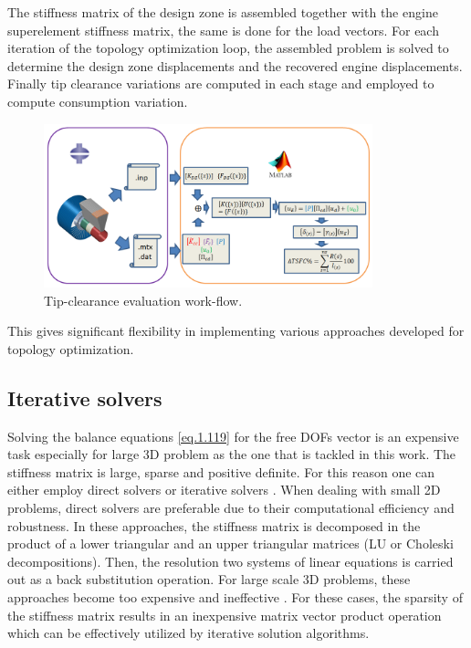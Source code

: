 The stiffness matrix of the design zone is assembled together with the engine superelement stiffness matrix, the same is done for the load vectors. For each iteration of the topology optimization loop, the assembled problem is solved to determine the design zone displacements and the recovered engine displacements.  Finally tip clearance variations are computed in each stage and employed to compute consumption variation.
\begin{figure}[hbt!]
\centering
\includegraphics[width=0.85\textwidth]{images/Ch1/tip_cl_wkf.png}
\caption{Tip-clearance evaluation work-flow. 
\label{f.6b}}
\end{figure}
 This gives significant flexibility in implementing various approaches developed for topology optimization.
\subsection{Iterative solvers}
\label{subsection1.4.2}
Solving the balance equations \eqref{eq.1.119} for the free DOFs vector is an expensive task especially for large 3D problem as the one that is tackled in this work. The stiffness matrix is large, sparse and positive definite. For this reason one can either employ direct solvers \cite{davis2006direct} or
iterative solvers \cite{saad2003iterative}. When dealing with small 2D problems, direct solvers are preferable due to their computational efficiency and robustness. In these approaches, the stiffness matrix is decomposed in the product of a lower triangular and an upper triangular matrices (LU or Choleski decompositions). Then, the resolution two systems of linear equations is carried out as a back substitution operation. For large scale 3D problems, these approaches become too expensive and ineffective \cite{davis2006direct}. For these cases, the sparsity of the stiffness matrix results in an inexpensive matrix vector product operation which can be effectively utilized by iterative solution algorithms.
